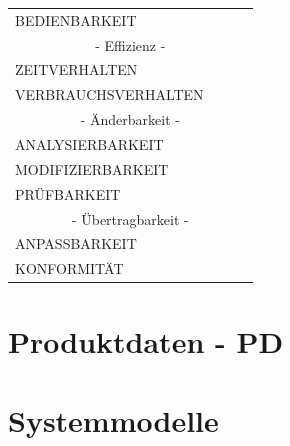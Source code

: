 \documentclass[a4paper]{scrreprt}
\begin{document}
\begin{table}[h!]
\begin{tabular}{llll}
    			BEDIENBARKEIT                                &                                        &                                   &                                      \\
    			\multicolumn{4}{c}{- Effizienz -}\\
    			ZEITVERHALTEN                                &                                        &                                   &                                      \\
    			VERBRAUCHSVERHALTEN                          &                                        &                                   &                                      \\
    			\multicolumn{4}{c}{- Änderbarkeit -}\\
    			ANALYSIERBARKEIT                             &                                        &                                   &                                      \\
    			MODIFIZIERBARKEIT                            &                                        &                                   &                                      \\
    			PRÜFBARKEIT                                  &                                        &                                   &                                      \\
    			\multicolumn{4}{c}{- Übertragbarkeit -}\\
    			ANPASSBARKEIT                                &                                        &                                   &                                      \\
    			KONFORMITÄT                                  &                                        &                                   &                                     
    		\end{tabular}
    	\end{table}

    \chapter{Produktdaten - PD}
    
		
    
    \chapter{Systemmodelle}
    
\end{document}
